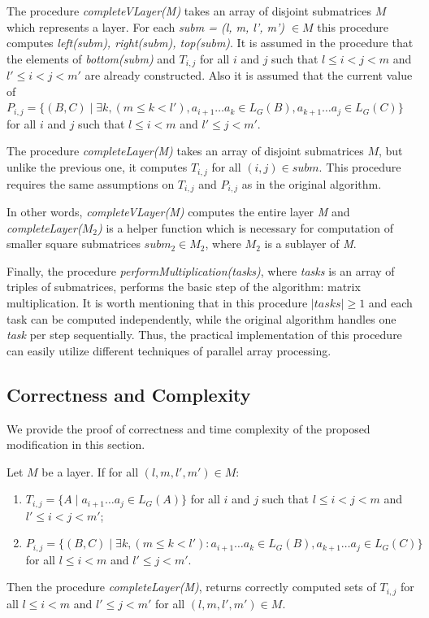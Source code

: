 The procedure \textit{completeVLayer(M)} takes an array of disjoint submatrices $M$ which represents a layer.
For each \textit{subm = (l, m, l', m') $\in M$} this procedure computes \textit{left(subm), right(subm), top(subm)}.
It is assumed in the procedure that the elements of \textit{bottom(subm)} and $T_{i, j}$ for all $i$ and $j$ such that $l \leq i < j < m$ and $  l' \leq i < j < m'$ are already constructed.
Also it is assumed that the current value of
$P_{i, j} =  \{ (B, C) \mid \exists k, (m \le k < l'), a_{i + 1} \dots a_{k} \in L_G(B), a_{k + 1} \dots a_{j} \in L_G(C)\} $ for all $i$ and $j$ such that $l \leq i < m$ and $l' \leq j < m'$.

The procedure \textit{completeLayer(M)} takes an array of disjoint submatrices $M$, but unlike the previous one, it computes $T_{i, j}$ for all $(i, j) \in subm$.
This procedure requires the same assumptions on $T_{i, j}$  and $P_{i, j}$  as in the original algorithm.

In other words, \textit{completeVLayer(M)} computes the entire layer \textit{M} \linebreak and \textit{completeLayer($M_{2}$)} is a helper function which is necessary for computation of smaller square submatrices $subm_{2} \in M_{2}$, where $M_2$ is a sublayer of \textit{M}.

Finally, the procedure \textit{performMultiplication(tasks)}, where \textit{tasks} is an array of triples of submatrices, performs the basic step of the algorithm: matrix multiplication.
It is worth mentioning that in this procedure $|tasks| \ge 1$ and each task can be computed independently, while the original algorithm handles one \textit{task} per step sequentially.
Thus, the practical implementation of this procedure can easily utilize different techniques of parallel array processing.

\subsection{Correctness and Complexity}

We provide the proof of correctness and time complexity of the proposed modification in this section.

\begin{lemma}
Let $M$ be a layer. If for all $(l, m, l', m') \in M$:
\begin{enumerate}
  \item $T_{i, j} = \{ A \mid  a_{i + 1} \dots a_{j} \in L_G(A)\}$ for all $i$ and $j$ such that $l \leq i < j < m$ and $l' \leq i < j < m'$;
  \item $P_{i, j} =  \{ (B, C) \mid \exists k, (m \le k < l'): a_{i + 1} \dots a_{k} \in L_G(B), a_{k + 1} \dots a_{j} \in L_G(C)\}$ for all $l \leq i < m$ and $l' \leq j < m'$.
\end{enumerate}

Then the procedure \textit{completeLayer(M)}, returns correctly computed sets of $T_{i, j}$ for all $l \leq i < m$ and $l' \leq j < m'$ for all $(l, m, l', m') \in M$.
\end{lemma}

